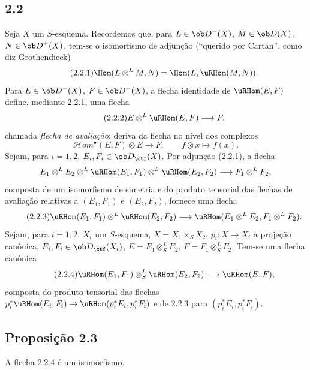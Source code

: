 \subsection*{2.2}
Seja $X$ um $S$-esquema. Recordemos que, para $L\in\ob D^{-}(X)$, $M\in\ob D(X)$, $N\in\ob D^{+}(X)$, tem-se o isomorfismo de adjunção (``querido por Cartan'', como diz Grothendieck)
\begin{equation}\tag{2.2.1}
\Hom(L\otimes^{L}M,N)=\Hom(L,\uRHom(M,N)).
\end{equation}
Para $E\in\ob D^{-}(X)$, $F\in\ob D^{+}(X)$, a flecha identidade de $\uRHom(E,F)$ define, mediante 2.2.1, uma flecha
\begin{equation}\tag{2.2.2}
E\otimes^{L}\uRHom(E,F)\longrightarrow F,
\end{equation}
chamada \emph{flecha de avaliação}: deriva da flecha no nível dos complexos
\[
\mathcal Hom^{\bullet}(E,F)\otimes E\longrightarrow F,
\qquad f\otimes x\longmapsto f(x).
\]
Sejam, para $i=1,2$, $E_i,F_i\in\ob D_{\ctf}(X)$. Por adjunção (2.2.1), a flecha
\[
E_1\otimes^{L}E_2\otimes^{L}\uRHom(E_1,F_1)\otimes^{L}\uRHom(E_2,F_2)\longrightarrow F_1\otimes^{L}F_2,
\]
composta de um isomorfismo de simetria e do produto tensorial das flechas de avaliação relativas a $(E_1,F_1)$ e $(E_2,F_2)$, fornece uma flecha
\begin{equation}\tag{2.2.3}
\uRHom(E_1,F_1)\otimes^{L}\uRHom(E_2,F_2)\longrightarrow\uRHom(E_1\otimes^{L}E_2,F_1\otimes^{L}F_2).
\end{equation}
Sejam, para $i=1,2$, $X_i$ um $S$-esquema, $X=X_1\times_SX_2$, $p_i:X\to X_i$ a projeção canônica, $E_i,F_i\in\ob D_{\ctf}(X_i)$, $E=E_1\otimes^{L}_{S}E_2$, $F=F_1\otimes^{L}_{S}F_2$. Tem-se uma flecha canônica
\begin{equation}\tag{2.2.4}
\uRHom(E_1,F_1)\otimes^{L}_{S}\uRHom(E_2,F_2)\longrightarrow\uRHom(E,F),
\end{equation}
composta do produto tensorial das flechas $p_i^{*}\uRHom(E_i,F_i)\to\uRHom(p_i^{*}E_i,p_i^{*}F_i)$ e de 2.2.3 para $(p_i^{*}E_i,p_i^{*}F_i)$.

\subsection*{Proposição 2.3}
A flecha 2.2.4 é um isomorfismo.

